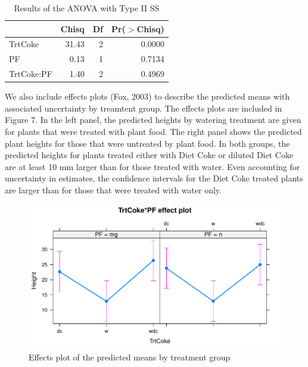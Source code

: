 \documentclass[1p,12pt]{elsarticle}\usepackage[]{graphicx}\usepackage[]{color}
\makeatletter
\def\maxwidth{ %
  \ifdim\Gin@nat@width>\linewidth
    \linewidth
  \else
    \Gin@nat@width
  \fi
}
\newenvironment{knitrout}{}{} %
\makeatother
\begin{document}
\begin{table}[ht]
\centering
\begin{tabular}{lrrr}
  \hline
 & Chisq & Df & Pr($>$Chisq) \\ 
  \hline
TrtCoke & 31.43 & 2 & 0.0000 \\ 
  PF & 0.13 & 1 & 0.7134 \\ 
  TrtCoke:PF & 1.40 & 2 & 0.4969 \\ 
   \hline
\end{tabular}
\caption{Results of the ANOVA with Type II SS}
\end{table}
 

We also include effects plots (Fox, 2003) to describe the predicted means with associated uncertainty by treamtent group. The effects plots are included in Figure 7. In the left panel, the predicted heights by watering treatment are given for plants that were treated with plant food. The right panel shows the predicted plant heights for those that were untreated by plant food. In both groups, the predicted heights for plants treated either with Diet Coke or diluted Diet Coke are at least 10 mm larger than for those treated with water. Even accounting for uncertainty in estimates, the confidence intervals for the Diet Coke treated plants are larger than for those that were treated with water only.  

\begin{knitrout}
\color{fgcolor}\begin{figure}
\includegraphics[width=\maxwidth]{figure/model_-1} \caption[Effects plot of the predicted means by treatment group]{Effects plot of the predicted means by treatment group}\label{fig:model }
\end{figure}


\end{knitrout}
\end{document}
